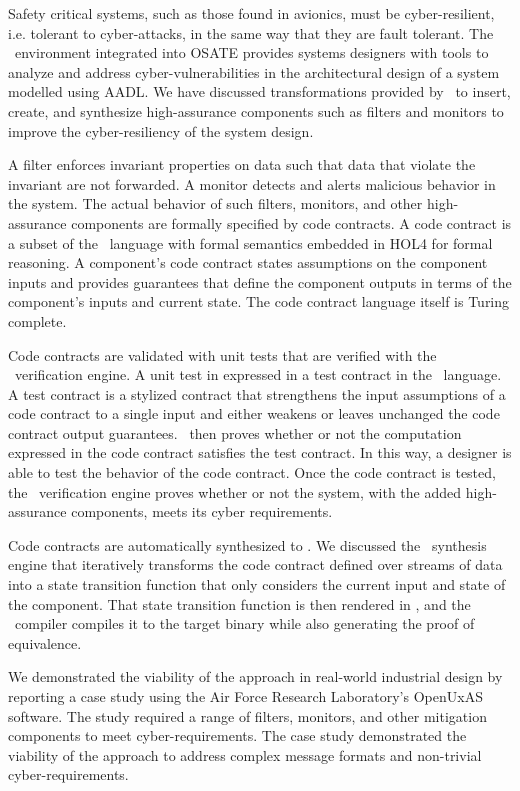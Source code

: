 Safety critical systems, such as those found in avionics, must be cyber-resilient, i.e. tolerant to cyber-attacks, in the same way that they are fault tolerant.
The \brfcs\ environment integrated into OSATE provides systems designers with tools to analyze and address cyber-vulnerabilities in the architectural design of a system modelled using AADL.
We have discussed transformations provided by \brfcs\ to insert, create, and synthesize high-assurance components such as filters and monitors to improve the cyber-resiliency of the system design.

A filter enforces invariant properties on data such that data that violate the invariant are not forwarded.
A monitor detects and alerts malicious behavior in the system.
The actual behavior of such filters, monitors, and other high-assurance components are formally specified by code contracts.
A code contract is a subset of the \agr\ language with formal semantics embedded in HOL4 for formal reasoning.
A component's code contract states assumptions on the component inputs and provides guarantees that define the component outputs in terms of the component's inputs and current state.
The code contract language itself is Turing complete.

Code contracts are validated with unit tests that are verified with the \agr\ verification engine.
A unit test in expressed in a test contract in the \agr\ language.
A test contract is a stylized contract that strengthens the input assumptions of a code contract to a single input and either weakens or leaves unchanged the code contract output guarantees.
\agr\ then proves whether or not the computation expressed in the code contract satisfies the test contract.
In this way, a designer is able to test the behavior of the code contract.
Once the code contract is tested, the \agr\ verification engine proves whether or not the system, with the added high-assurance components, meets its cyber requirements.

Code contracts are automatically synthesized to \ckml.
We discussed the \splt\ synthesis engine that iteratively transforms the code contract defined over streams of data into a state transition function that only considers the current input and state of the component.
That state transition function is then rendered in \ckml, and the \ckml\ compiler compiles it to the target binary while also generating the proof of equivalence.

We demonstrated the viability of the approach in real-world industrial design by reporting a case study using the Air Force Research Laboratory's OpenUxAS software.
The study required a range of filters, monitors, and other mitigation components to meet cyber-requirements.
The case study demonstrated the viability of the approach to address complex message formats and non-trivial cyber-requirements.

